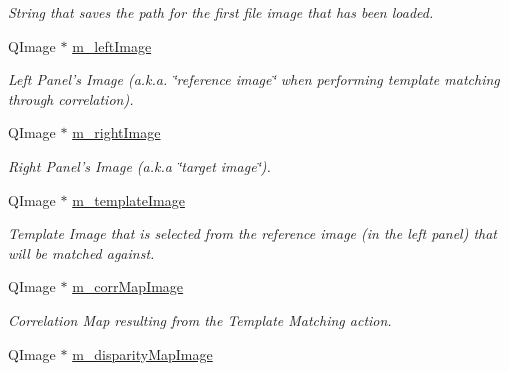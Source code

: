 \begin{DoxyCompactItemize}
\begin{DoxyCompactList}\small\item\em String that saves the path for the first file image that has been loaded. \item\end{DoxyCompactList}\item 
\hypertarget{classQcorr_ae8bdd4be8a0c3023be34a1301b28c913}{
QImage $\ast$ \hyperlink{classQcorr_ae8bdd4be8a0c3023be34a1301b28c913}{m\_\-leftImage}}
\label{classQcorr_ae8bdd4be8a0c3023be34a1301b28c913}

\begin{DoxyCompactList}\small\item\em Left Panel's Image (a.k.a. \char`\"{}reference image\char`\"{} when performing template matching through correlation). \item\end{DoxyCompactList}\item 
\hypertarget{classQcorr_aae1695d731f191c694186e00b96f469e}{
QImage $\ast$ \hyperlink{classQcorr_aae1695d731f191c694186e00b96f469e}{m\_\-rightImage}}
\label{classQcorr_aae1695d731f191c694186e00b96f469e}

\begin{DoxyCompactList}\small\item\em Right Panel's Image (a.k.a \char`\"{}target image\char`\"{}). \item\end{DoxyCompactList}\item 
\hypertarget{classQcorr_a5594d939890f10991da0009e4c32bea3}{
QImage $\ast$ \hyperlink{classQcorr_a5594d939890f10991da0009e4c32bea3}{m\_\-templateImage}}
\label{classQcorr_a5594d939890f10991da0009e4c32bea3}

\begin{DoxyCompactList}\small\item\em Template Image that is selected from the reference image (in the left panel) that will be matched against. \item\end{DoxyCompactList}\item 
\hypertarget{classQcorr_ac7dc2785613864bea2d8bb0b5f009f36}{
QImage $\ast$ \hyperlink{classQcorr_ac7dc2785613864bea2d8bb0b5f009f36}{m\_\-corrMapImage}}
\label{classQcorr_ac7dc2785613864bea2d8bb0b5f009f36}

\begin{DoxyCompactList}\small\item\em Correlation Map resulting from the Template Matching action. \item\end{DoxyCompactList}\item 
\hypertarget{classQcorr_a731915641051962d6a03a31b772640d4}{
QImage $\ast$ \hyperlink{classQcorr_a731915641051962d6a03a31b772640d4}{m\_\-disparityMapImage}}
\label{classQcorr_a731915641051962d6a03a31b772640d4}


\end{DoxyCompactItemize}
